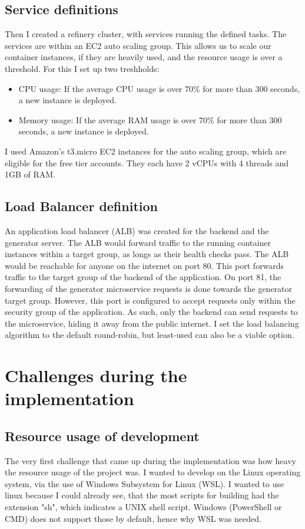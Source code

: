 		\subsection{Service definitions} \label{awsservices}
			Then I created a refinery cluster, with services running the defined tasks. The services are within an EC2 auto scaling group. 
			This allows us to scale our container instances, if they are heavily used, and the resource usage is over a threshold.
			For this I set up two treshholds:
			\begin{itemize}
				\item CPU usage: If the average CPU usage is over 70\% for more than 300 seconds, a new instance is deployed.
				\item Memory usage: If the average RAM usage is over 70\% for more than 300 seconds, a new instance is deployed.
			\end{itemize}
			I used Amazon's t3.micro EC2 instances for the auto scaling group, which are eligible for the free tier accounts. 
			They each have 2 vCPUs with 4 threads and 1GB of RAM.
		
		\subsection{Load Balancer definition} \label{awslb}
			An application load balancer (ALB) was created for the 
			backend and the generator server. The ALB would forward traffic to the running container instances within a target group, as longs as their
			health checks pass. 
			The ALB would be reachable for anyone on the internet on port 80. This port forwards traffic to the target group of the backend of the application.
			On port 81, the forwarding of the generator microservice requests is done towards the generator target group. However, this port is configured
			to accept requests only within the security group of the application. As such, only the backend can send requests to the microservice, hiding it 
			away from the public internet.
			I set the load balancing algorithm to the default round-robin, but least-used can also be a viable option.

	\section{Challenges during the implementation} \label{challenges}
	\subsection{Resource usage of development}
		The very first challenge that came up during the implementation was how heavy the resource usage of the project was.
		I wanted to develop on the Linux operating system, via the use of Windows Subsystem for Linux (WSL). I wanted to use linux
		because I could already see, that the most scripts for building had the extension "sh", which indicates a UNIX shell script.
		Windows (PowerShell or CMD) does not support those by default, hence why WSL was needed.

